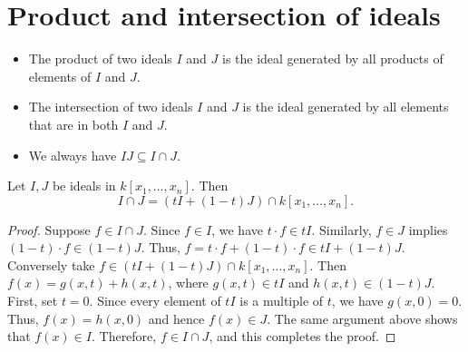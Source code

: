 \documentclass[12pt]{article}
\begin{document}
\section{Product and intersection of ideals}
\begin{itemize}
	\item The product of two ideals \( I \) and \( J \) is the ideal generated by all products of elements of \( I \) and \( J \).
	\item The intersection of two ideals \( I \) and \( J \) is the ideal generated by all elements that are in both \( I \) and \( J \).
	\item We always have \( IJ \subseteq I \cap J \).
\end{itemize}

\begin{theorem}
	Let \( I, J \) be ideals in \( k[x_1, \ldots, x_n] \). Then
	\[
		I \cap J = (tI + (1 - t)J) \cap k[x_1, \ldots, x_n].
	\]
\end{theorem}

\begin{proof}
	Suppose \( f \in I \cap J \). Since \( f \in I \), we have \( t \cdot f \in tI \). Similarly, \( f \in J \) implies \( (1 - t) \cdot f \in (1 - t)J \). Thus, \( f = t \cdot f + (1 - t) \cdot f \in tI + (1 - t)J \).  Conversely take \( f \in (tI + (1 - t)J) \cap k[x_1, \ldots, x_n] \). Then \( f(x) = g(x, t) + h(x, t) \), where \( g(x, t) \in tI \) and \( h(x, t) \in (1 - t)J \). First, set \( t = 0 \). Since every element of \( tI \) is a multiple of \( t \), we have \( g(x, 0) = 0 \). Thus, \( f(x) = h(x, 0) \) and hence \( f(x) \in J \). The same argument above shows that \( f(x) \in I \). Therefore, \( f \in I \cap J \), and this completes the proof.
\end{proof}
\end{document}
